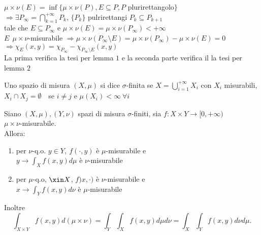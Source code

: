 \documentclass[12px]{article}
\begin{document}
\begin{dimo}
	$\mu\times\nu(E) = \inf\{\mu\times\nu(P), E\subseteq P, P$ plurirettangolo$\}$\\
	$ \Rightarrow  \exists P_\infty = \bigcap^{+\infty}_{k=1}P_k$, $\{P_k\}$ pulrirettangi  $P_k\subseteq P_{k+1}$\\
	tale che  $E\subseteq P_{\infty}$ e  $\mu\times\nu(E) = \mu\times\nu(P_\infty)< +\infty$\\
	 $E \ \ \mu\times\nu$-misurabile  $ \Rightarrow  \mu\times\nu (P_\infty\setminus E) =\mu\times\nu (P_\infty) - \mu\times\nu(E) = 0$ \\
	 $ \Rightarrow  \chi_E(x,y) = \chi_{P_\infty} - \chi_{P_\infty\setminus E}(x,y)$ \\
	 La prima verifica la tesi per lemma $1$ e la seconda parte verifica il la tesi per lemma $2$
\end{dimo}
\begin{defi}
	Uno spazio di misura $(X,\mu)$ si dice  $\sigma$-finita se $X = \bigcup^{+\infty}_{i=1}X_i$ con $X_i$ misurabili, $X_i\cap X_j = \emptyset \ \ \ $ se  $i\neq j$ e  $\mu(X_i) < \infty \ \forall i$
\end{defi}
\begin{teo}[Tonelli]
	Siano $(X,\mu), (Y,\nu)$ spazi di misura  $\sigma$-finiti, sia $f: X \times Y \rightarrow [0,+\infty)$\\ $\mu\times\nu$-misurabile.\\
	Allora:
	\begin{enumerate}
		\item per $\nu$-q.o. $y\in Y, \ f(\cdot ,y)$ è  $\mu$-misurabile e \\
			$y \rightarrow \int_X f(x,y)d\mu$ è $\nu$-misurabile
		\item per $\mu$-q.o, $\xin X$, $f)x,\cdot)$ è $\nu$-misurabile e\\
			$x \rightarrow\int_Y f(x,y)d\nu$  è $\mu$-misurabile
	\end{enumerate}
	Inoltre 
	 \[
	\int_{X\times Y}f(x,y)d(\mu\times\nu) = \int_Y\int_X f(x,y)d\mu d \nu = \int_X\int_Y f(x,y)d\nu d\mu
	.\] 
\end{teo}
\end{document}
